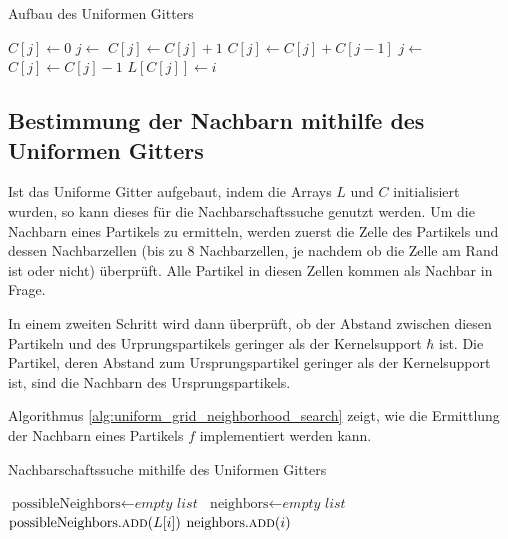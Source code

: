 \documentclass[11pt,
a4paper,
parskip=half, %
BCOR=10mm, %
english,
ngerman]{scrreprt}
\begin{document}
\begin{algorithm}
    \caption{Aufbau des Uniformen Gitters}
    \label{alg:uniform_grid_initialization}
    \begin{algorithmic}[1]
            \State $C[j] \gets 0$
        \EndFor
            \State $j \gets$ 
            \State $C[j] \gets C[j] + 1$
        \EndFor
            \State $C[j] \gets C[j] + C[j-1]$
        \EndFor
            \State $j \gets$ 
            \State $C[j] \gets C[j] - 1$
            \State $L[C[j]] \gets i$
        \EndFor
    \end{algorithmic}
\end{algorithm}


\subsection{Bestimmung der Nachbarn mithilfe des Uniformen Gitters}
Ist das Uniforme Gitter aufgebaut, indem die Arrays $L$ und $C$ initialisiert wurden, so kann dieses für die Nachbarschaftssuche genutzt werden.
Um die Nachbarn eines Partikels zu ermitteln,
werden zuerst die Zelle des Partikels und dessen Nachbarzellen (bis zu 8 Nachbarzellen, je nachdem ob die Zelle am Rand ist oder nicht) überprüft.
Alle Partikel in diesen Zellen kommen als Nachbar in Frage.

In einem zweiten Schritt wird dann überprüft, ob der Abstand zwischen diesen Partikeln und des Urprungspartikels geringer als der Kernelsupport $\hbar$ ist.
Die Partikel, deren Abstand zum Ursprungspartikel geringer als der Kernelsupport ist, sind die Nachbarn des Ursprungspartikels.

Algorithmus \ref{alg:uniform_grid_neighborhood_search} zeigt, wie die Ermittlung der Nachbarn eines Partikels $f$ implementiert werden kann.

\begin{algorithm}
    \caption{Nachbarschaftssuche mithilfe des Uniformen Gitters}
    \label{alg:uniform_grid_neighborhood_search}
    \begin{algorithmic}[1]
        \State $\text{possibleNeighbors} \gets \textit{empty list}$
        \State $\text{neighbors} \gets \textit{empty list}$
                \State $\text{possibleNeighbors.} \Call{add}{L[i]}$
            \EndFor
        \EndFor
            \State $\text{neighbors.} \Call{add}{i}$
            \EndIf
        \EndFor
    \end{algorithmic}
\end{algorithm}
\end{document}
